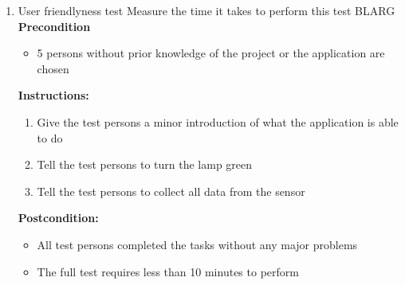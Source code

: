 \documentclass[a4paper]{article}
\newlength{\testlabellength}
\newenvironment{testlist}{\begin{enumerate}[label=\bfseries Instruction \thesubsection.\arabic* , labelindent=0pt, labelwidth=\testlabellength , leftmargin=2cm]}{\end{enumerate}}
\newenvironment{precondition}{
{\color{white}BLARG}\\ 
\textbf{Precondition}
\begin{itemize}[labelindent=0cm, labelwidth=2cm , leftmargin=1cm]
}
{\end{itemize}}
\newenvironment{instruction}{
\textbf{Instructions:}
\begin{enumerate}[label=\bfseries  \arabic*., labelindent=0cm, labelwidth=2cm , leftmargin=1cm]
}
{\end{enumerate}}
\newenvironment{postcondition}{
\textbf{Postcondition:}
\begin{itemize}[labelindent=0cm, labelwidth=2cm , leftmargin=1cm]
}
{\end{itemize}}
\begin{document}
\begin{appendices}
\begin{testlist}
	\item User friendlyness test \newline
		Measure the time it takes to perform this test
		\begin{precondition}
			\item 5 persons without prior knowledge of the project or the application are chosen
		\end{precondition}
		\begin{instruction}
			\item Give the test persons a minor introduction of what the application is able to do
            \item Tell the test persons to turn the lamp green
            \item Tell the test persons to collect all data from the sensor
		\end{instruction}
		\begin{postcondition}
			\item All test persons completed the tasks without any major problems
			\item The full test requires less than 10 minutes to perform
		\end{postcondition}


\end{testlist}
\end{appendices}
\end{document}
